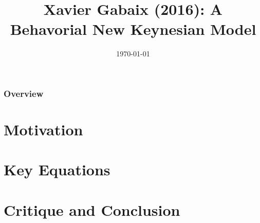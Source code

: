 \documentclass{beamer}
\title[A Behavorial New Keynesian Model]{Xavier Gabaix (2016): A Behavorial New Keynesian Model} %
\author{} %
\institute[] %
{
\\Carlos Montoya, Patrick Molligo and Clemens Stiewe %
\medskip
\textit{} %
}
\date{\today} %
\begin{document}
\begin{frame}
\titlepage %
\end{frame}

\begin{frame}
\frametitle{Overview} %
\tableofcontents %
\end{frame}


\section{Motivation} %
\section{Key Equations}
\section{Critique and Conclusion}


\end{document}
